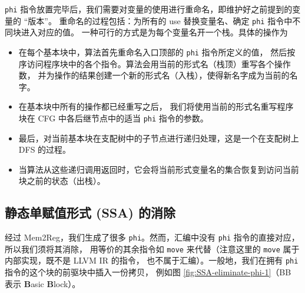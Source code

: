 \texttt{phi} 指令放置完毕后，我们需要对变量的使用进行重命名，即维护好之前提到的变量的 “版本”。
重命名的过程包括：为所有的 use 替换变量名、确定 \texttt{phi} 指令中不同块进入对应的值。
一种可行的方式是为每个变量名开一个栈。具体的操作为
\begin{itemize}
  \item 在每个基本块中，算法首先重命名入口顶部的 \texttt{phi} 指令所定义的值，
    然后按序访问程序块中的各个指令。算法会用当前的形式名（栈顶）重写各个操作数，
    并为操作的结果创建一个新的形式名（入栈），使得新名字成为当前的名字。
  \item 在基本块中所有的操作都已经重写之后，
    我们将使用当前的形式名重写程序块在 CFG 中各后继节点中的适当 \texttt{phi} 指令的参数。
  \item 最后，对当前基本块在支配树中的子节点进行递归处理，这是一个在支配树上 DFS 的过程。
  \item 当算法从这些递归调用返回时，它会将当前形式变量名的集合恢复到访问当前块之前的状态（出栈）。
\end{itemize}

\subsection{静态单赋值形式 (SSA) 的消除} \label{SSA-eliminate-phi}

经过 Mem2Reg，我们生成了很多 \texttt{phi}。然而，汇编中没有 \texttt{phi} 指令的直接对应，所以我们须将其消除，
用等价的其余指令如 \texttt{move} 来代替（注意这里的 \texttt{move} 属于内部实现，既不是 LLVM IR 的指令，
也不属于汇编）。一般地，我们在拥有 \texttt{phi} 指令的这个块的前驱块中插入一份拷贝，
例如图 \ref{fig:SSA-eliminate-phi-1}（BB 表示 \textbf{B}asic \textbf{B}lock）。


